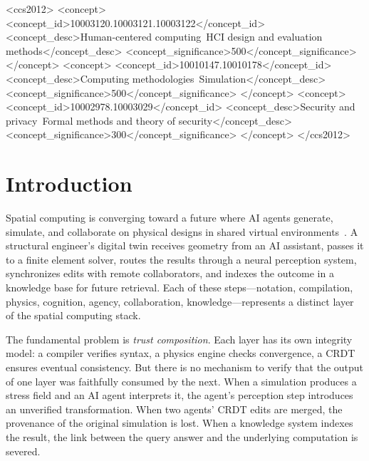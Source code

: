 \documentclass[sigchi-a]{acmart}
\begin{document}
\begin{CCSXML}
<ccs2012>
<concept>
<concept_id>10003120.10003121.10003122</concept_id>
<concept_desc>Human-centered computing~HCI design and evaluation methods</concept_desc>
<concept_significance>500</concept_significance>
</concept>
<concept>
<concept_id>10010147.10010178</concept_id>
<concept_desc>Computing methodologies~Simulation</concept_desc>
<concept_significance>500</concept_significance>
</concept>
<concept>
<concept_id>10002978.10003029</concept_id>
<concept_desc>Security and privacy~Formal methods and theory of security</concept_desc>
<concept_significance>300</concept_significance>
</concept>
</ccs2012>
\end{CCSXML}



\maketitle


\section{Introduction}
\label{sec:intro}

Spatial computing is converging toward a future where AI agents generate,
simulate, and collaborate on physical designs in shared virtual
environments~\cite{meta-spatial2025, apple-visionpro2024}. A structural
engineer's digital twin receives geometry from an AI assistant, passes it to
a finite element solver, routes the results through a neural perception
system, synchronizes edits with remote collaborators, and indexes the outcome
in a knowledge base for future retrieval. Each of these steps---notation,
compilation, physics, cognition, agency, collaboration, knowledge---represents
a distinct layer of the spatial computing stack.

The fundamental problem is \emph{trust composition}. Each layer has its own
integrity model: a compiler verifies syntax, a physics engine checks
convergence, a CRDT ensures eventual consistency. But there is no mechanism
to verify that the output of one layer was faithfully consumed by the next.
When a simulation produces a stress field and an AI agent interprets it, the
agent's perception step introduces an unverified transformation. When two
agents' CRDT edits are merged, the provenance of the original simulation
is lost. When a knowledge system indexes the result, the link between the
query answer and the underlying computation is severed.
\end{document}
